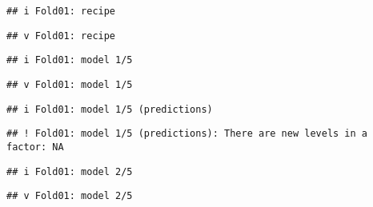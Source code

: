\documentclass[
]{article}
\newenvironment{Shaded}{\begin{snugshade}}{\end{snugshade}}
\newcommand{\DataTypeTok}[1]{\textcolor[rgb]{0.13,0.29,0.53}{#1}}
\newcommand{\KeywordTok}[1]{\textcolor[rgb]{0.13,0.29,0.53}{\textbf{#1}}}
\newcommand{\NormalTok}[1]{#1}
\newcommand{\OperatorTok}[1]{\textcolor[rgb]{0.81,0.36,0.00}{\textbf{#1}}}
\newcommand{\OtherTok}[1]{\textcolor[rgb]{0.56,0.35,0.01}{#1}}
\newcommand{\StringTok}[1]{\textcolor[rgb]{0.31,0.60,0.02}{#1}}
\begin{document}
\begin{Shaded}
\end{Shaded}

\begin{verbatim}
## i Fold01: recipe
\end{verbatim}

\begin{verbatim}
## v Fold01: recipe
\end{verbatim}

\begin{verbatim}
## i Fold01: model 1/5
\end{verbatim}

\begin{verbatim}
## v Fold01: model 1/5
\end{verbatim}

\begin{verbatim}
## i Fold01: model 1/5 (predictions)
\end{verbatim}

\begin{verbatim}
## ! Fold01: model 1/5 (predictions): There are new levels in a factor: NA
\end{verbatim}

\begin{verbatim}
## i Fold01: model 2/5
\end{verbatim}

\begin{verbatim}
## v Fold01: model 2/5
\end{verbatim}
\end{document}
